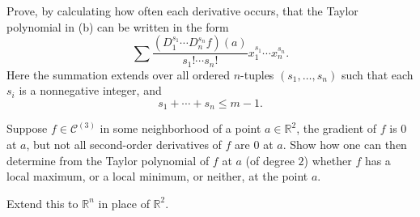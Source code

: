 \begin{exercise}[Rudin 9.30]
\begin{enumerate}[label=(\alph*)]
			Prove, by calculating how often each derivative occurs, that the Taylor polynomial in (b) can be written in the form
			\begin{equation}
				\sum
				\frac{(D_1^{s_1}\cdots D_n^{s_n}f)(a)}
				{s_1!\cdots s_n!}
				x_1^{s_1}\cdots x_n^{s_n}.
			\end{equation}
			Here the summation extends over all ordered $n$-tuples $(s_1,\ldots,s_n)$ such that each $s_i$ is a nonnegative integer, and
			\begin{equation}
				s_1+\cdots+s_n\leq m-1.
			\end{equation}
		\end{enumerate}
	\end{exercise}

	\begin{exercise}[Rudin 9.31]
		Suppose $f\in\mathscr{C}^{(3)}$ in some neighborhood of a point $a\in\mathbb{R}^2$, the gradient of $f$ is $0$ at $a$, but not all second-order derivatives of $f$ are $0$ at $a$. Show how one can then determine from the Taylor polynomial of $f$ at $a$ (of degree $2$) whether $f$ has a local maximum, or a local minimum, or neither, at the point $a$.

		Extend this to $\mathbb{R}^n$ in place of $\mathbb{R}^2$.
	\end{exercise}
